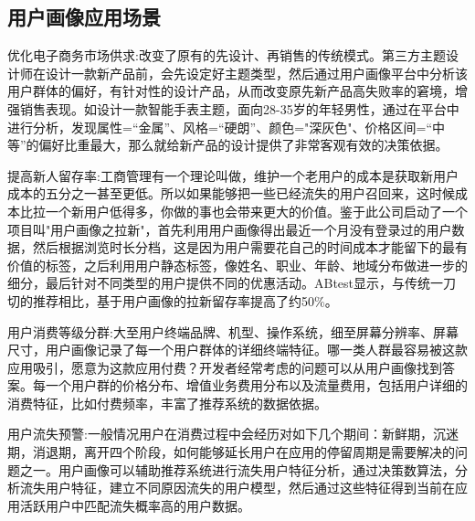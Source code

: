         \begin{figure}
        \centering
          \label{pic:hl_usergroup}
        \end{figure}

		\subsection{用户画像应用场景}
		优化电子商务市场供求:改变了原有的先设计、再销售的传统模式。第三方主题设计师在设计一款新产品前，会先设定好主题类型，然后通过用户画像平台中分析该用户群体的偏好，有针对性的设计产品，从而改变原先新产品高失败率的窘境，增强销售表现。如设计一款智能手表主题，面向28-35岁的年轻男性，通过在平台中进行分析，发现属性=“金属”、风格=“硬朗”、颜色="深灰色"、价格区间=“中等”的偏好比重最大，那么就给新产品的设计提供了非常客观有效的决策依据。
		
		提高新人留存率:工商管理有一个理论叫做，维护一个老用户的成本是获取新用户成本的五分之一甚至更低。所以如果能够把一些已经流失的用户召回来，这时候成本比拉一个新用户低得多，你做的事也会带来更大的价值。鉴于此公司启动了一个项目叫"用户画像之拉新"，首先利用用户画像得出最近一个月没有登录过的用户数据，然后根据浏览时长分档，这是因为用户需要花自己的时间成本才能留下的最有价值的标签，之后利用用户静态标签，像姓名、职业、年龄、地域分布做进一步的细分，最后针对不同类型的用户提供不同的优惠活动。ABtest显示，与传统一刀切的推荐相比，基于用户画像的拉新留存率提高了约50\%。
		
		用户消费等级分群:大至用户终端品牌、机型、操作系统，细至屏幕分辨率、屏幕尺寸，用户画像记录了每一个用户群体的详细终端特征。哪一类人群最容易被这款应用吸引，愿意为这款应用付费？开发者经常考虑的问题可以从用户画像找到答案。每一个用户群的价格分布、增值业务费用分布以及流量费用，包括用户详细的消费特征，比如付费频率，丰富了推荐系统的数据依据。
		
		用户流失预警:一般情况用户在消费过程中会经历对如下几个期间：新鲜期，沉迷期，消退期，离开四个阶段，如何能够延长用户在应用的停留周期是需要解决的问题之一。用户画像可以辅助推荐系统进行流失用户特征分析，通过决策数算法，分析流失用户特征，建立不同原因流失的用户模型，然后通过这些特征得到当前在应用活跃用户中匹配流失概率高的用户数据。
		
